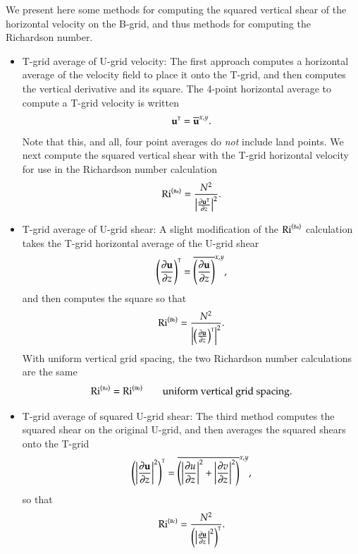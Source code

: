 We present here some methods for computing the squared vertical shear
of the horizontal velocity on the B-grid, and thus methods for
computing the Richardson number.
\begin{itemize}

\item {\sc T-grid average of U-grid velocity}: The first approach
  computes a horizontal average of the velocity field to place it onto
  the T-grid, and then computes the vertical derivative and its
  square.  The 4-point horizontal average to compute a T-grid velocity
  is written
\begin{equation}
  {\bf u}^{\mbox{\tiny T}}  = \overline{\bf u}^{x,y}.
\end{equation}
Note that this, and all, four point averages do {\it not} include land
points. We next compute the squared vertical shear with the T-grid
horizontal velocity for use in the Richardson number calculation
\begin{equation}
    \mbox{Ri}^{(\mbox{\tiny Ba})} = \frac{N^{2}} { \left| \frac{\partial {\bf u}^{\mbox{\tiny T}}}{\partial z} \right|^{2} }.
\end{equation}

\item {\sc T-grid average of U-grid shear}: A slight modification of
  the $\mbox{Ri}^{(\mbox{\tiny Ba})}$ calculation takes the T-grid
  horizontal average of the U-grid shear
\begin{equation}
  \left( \frac{\partial {\bf u}}{\partial z} \right)^{\mbox{\tiny T}}
  = \overline{ \left( \frac{\partial {\bf u}}{\partial z} \right)}^{x,y},
\end{equation}
and then computes the square so that
\begin{equation}
    \mbox{Ri}^{(\mbox{\tiny Bb})} = \frac{N^{2}} { \left|  \left( \frac{\partial {\bf u}}{\partial z} \right)^{\mbox{\tiny T}} \right|^{2} }.
\end{equation}
With uniform vertical grid spacing, the two Richardson number
calculations are the same
\begin{equation}
 \mbox{Ri}^{(\mbox{\tiny Ba})} = \mbox{Ri}^{(\mbox{\tiny Bb})}  \qquad \mbox{uniform vertical grid spacing.}
\end{equation}

\item {\sc T-grid average of squared U-grid shear}: The third method
  computes the squared shear on the original U-grid, and then averages
  the squared shears onto the T-grid
\begin{equation}
  \left( \left| \frac{\partial {\bf u}}{\partial z} \right|^{2} \right)^{\mbox{\tiny T}}
  = \overline{  \left( \left| \frac{\partial u}{\partial z}  \right|^{2}  
     +  \left| \frac{\partial v}{\partial z}  \right|^{2}  \right)  }^{x,y},
\end{equation}
so that 
\begin{equation}
    \mbox{Ri}^{(\mbox{\tiny Bc})} = \frac{N^{2}} { \left( \left| \frac{\partial {\bf u}}{\partial z} \right|^{2} \right)^{\mbox{\tiny T}}}.
\end{equation}

\end{itemize}



